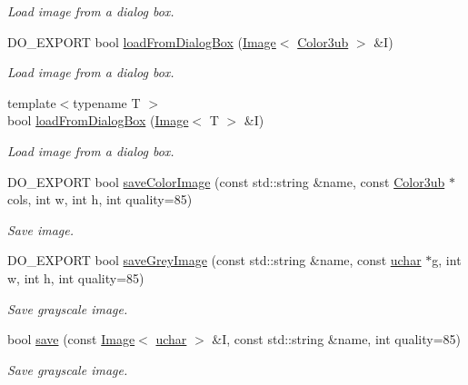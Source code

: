 \begin{DoxyCompactItemize}
\begin{DoxyCompactList}\small\item\em Load image from a dialog box. \end{DoxyCompactList}\item 
D\-O\-\_\-\-E\-X\-P\-O\-R\-T bool \hyperlink{group___image_i_o_ga5fead3977bbe969d001d0abd115fe4b5}{load\-From\-Dialog\-Box} (\hyperlink{class_d_o_1_1_image}{Image}$<$ \hyperlink{group___color_types_ga018b76cd00a4f9dca7dd06246d5bd3aa}{Color3ub} $>$ \&I)
\begin{DoxyCompactList}\small\item\em Load image from a dialog box. \end{DoxyCompactList}\item 
{\footnotesize template$<$typename T $>$ }\\bool \hyperlink{group___image_i_o_ga3fb8d2fc4fd39bbf6352d316fd656bea}{load\-From\-Dialog\-Box} (\hyperlink{class_d_o_1_1_image}{Image}$<$ T $>$ \&I)
\begin{DoxyCompactList}\small\item\em Load image from a dialog box. \end{DoxyCompactList}\item 
D\-O\-\_\-\-E\-X\-P\-O\-R\-T bool \hyperlink{group___image_i_o_gaa3b2869a4d9540ce1f273ae2c628964e}{save\-Color\-Image} (const std\-::string \&name, const \hyperlink{group___color_types_ga018b76cd00a4f9dca7dd06246d5bd3aa}{Color3ub} $\ast$cols, int w, int h, int quality=85)
\begin{DoxyCompactList}\small\item\em Save image. \end{DoxyCompactList}\item 
D\-O\-\_\-\-E\-X\-P\-O\-R\-T bool \hyperlink{group___image_i_o_ga466864eb2eeba5e29bf95d08b452e629}{save\-Grey\-Image} (const std\-::string \&name, const \hyperlink{group___eigen_typedefs_ga65f85814a8290f9797005d3b28e7e5fc}{uchar} $\ast$g, int w, int h, int quality=85)
\begin{DoxyCompactList}\small\item\em Save grayscale image. \end{DoxyCompactList}\item 
bool \hyperlink{group___image_i_o_gaff61fd0f339b25764e9d891130954a69}{save} (const \hyperlink{class_d_o_1_1_image}{Image}$<$ \hyperlink{group___eigen_typedefs_ga65f85814a8290f9797005d3b28e7e5fc}{uchar} $>$ \&I, const std\-::string \&name, int quality=85)
\begin{DoxyCompactList}\small\item\em Save grayscale image. \end{DoxyCompactList}\item 

\end{DoxyCompactItemize}
